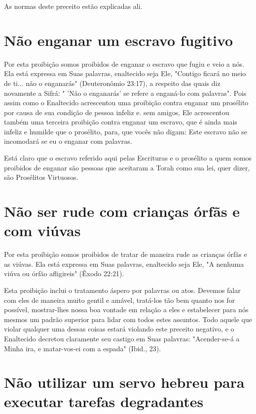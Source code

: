 \begin{itemize}
\begin{enumrate}
\begin{itemize}
\begin{itemize}
\begin{itemize}
As normas deste preceito estão explicadas ali.

\section{Não enganar um escravo fugitivo}

Por esta proibição somos proibidos de enganar o escravo que fugiu e veio
a nós. Ela está expressa em Suas palavras, enaltecido seja Ele, "Contigo
ficará no meio de ti... não o enganarás" (Deuteronômio 23:17), a
respeito das quais diz novamente a Sifrá: " 'Não o enganarás' se refere
a enganá-lo com pa­lavras". Pois assim como o Enaltecido acrescentou uma
proibição contra enga­nar um prosélito por causa de sua condição de
pessoa infeliz e. sem amigos, Ele acrescentou também uma terceira
proibição contra enganar um escravo, que é ainda mais infeliz e humilde
que o prosélito, para, que vocês não digam: Este escravo não se
incomodará se eu o enganar com palavras.

Está claro que o escravo referido aqui pelas Escrituras e o prosélito a
quem somos proibidos de enganar são pessoas que aceitaram a Torah como
sua lei, quer dizer, são Prosélitos Virtuosos.

\section{Não ser rude com crianças órfãs e com viúvas}

Por esta proibição somos proibidos de tratar de maneira rude as
crian­ças órfãs e as viúvas. Ela está expressa em Suas palavras,
enaltecido seja Ele, "A nenhuma viúva ou órfão afligireis" (Êxodo
22:21).

Esta proibição inclui o tratamento áspero por palavras ou atos. De­vemos
falar com eles de maneira muito gentil e amável, tratá-los tão bem
quan­to nos for possível, mostrar-lhes nossa boa vontade em relação a
eles e estabe­lecer para nós mesmos um padrão superior para lidar com
todos estes assun­tos. Todo aquele que violar qualquer uma dessas coisas
estará violando este preceito negativo, e o Enaltecido decretou
claramente seu castigo em Suas pa­lavras: "Acender-se-á a Minha ira, e
matar-vos-ei com a espada" (Ibid., 23).

\section{Não utilizar um servo hebreu para executar tarefas degradantes}


\end{itemize}
\end{itemize}
\end{itemize}
\end{enumrate}
\end{itemize}
